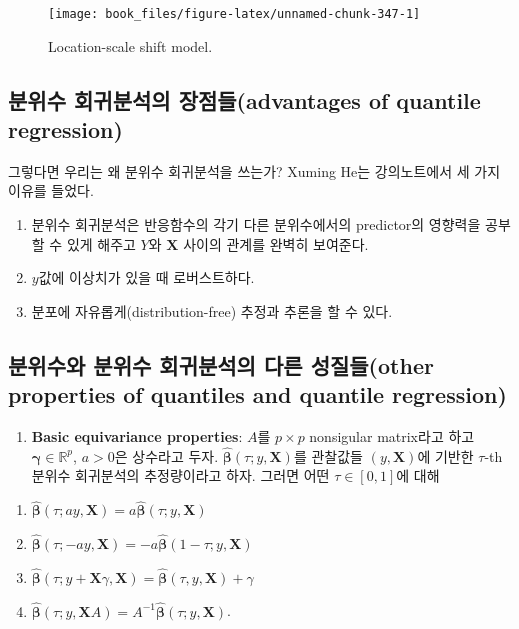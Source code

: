 \documentclass[b5paper,]{scrbook}
\providecommand{\tightlist}{%
  \setlength{\itemsep}{0pt}\setlength{\parskip}{0pt}}
\theoremstyle{plain}
\theoremstyle{definition}
\numberwithin{equation}{section}
\begin{document}
\begin{figure}

{\centering \texttt{[image: book\_files/figure-latex/unnamed-chunk-347-1]} 

}

\caption{Location-scale shift model.}\label{fig:unnamed-chunk-347}
\end{figure}

\hypertarget{--advantages-of-quantile-regression}{%
\subsection{분위수 회귀분석의 장점들(advantages of quantile regression)}\label{--advantages-of-quantile-regression}}

그렇다면 우리는 왜 분위수 회귀분석을 쓰는가? Xuming He는 강의노트에서 세 가지 이유를 들었다.

\begin{enumerate}
\def\labelenumi{\arabic{enumi}.}
\item
  분위수 회귀분석은 반응함수의 각기 다른 분위수에서의 predictor의 영향력을 공부할 수 있게 해주고 \(Y\)와 \(\mathbf{X}\) 사이의 관계를 완벽히 보여준다.
\item
  \(y\)값에 이상치가 있을 때 로버스트하다.
\item
  분포에 자유롭게(distribution-free) 추정과 추론을 할 수 있다.
\end{enumerate}

\hypertarget{----other-properties-of-quantiles-and-quantile-regression}{%
\subsection{분위수와 분위수 회귀분석의 다른 성질들(other properties of quantiles and quantile regression)}\label{----other-properties-of-quantiles-and-quantile-regression}}

\begin{enumerate}
\def\labelenumi{\arabic{enumi}.}
\tightlist
\item
  \textbf{Basic equivariance properties}: \(A\)를 \(p\times p\) nonsigular matrix라고 하고 \(\boldsymbol{\gamma}\in\mathbb{R}^{p}\), \(a>0\)은 상수라고 두자. \(\hat{\boldsymbol{\beta}}(\tau;y,\mathbf{X})\)를 관찰값들 \((y,\mathbf{X})\)에 기반한 \(\tau\)-th 분위수 회귀분석의 추정량이라고 하자. 그러면 어떤 \(\tau\in [0,1]\)에 대해
\end{enumerate}

\begin{enumerate}
\def\labelenumi{\roman{enumi}.}
\tightlist
\item
  \(\hat{\boldsymbol{\beta}}(\tau; ay, \mathbf{X})=a\hat{\boldsymbol{\beta}}(\tau;y,\mathbf{X})\)
\item
  \(\hat{\boldsymbol{\beta}}(\tau; -ay, \mathbf{X})=-a\hat{\boldsymbol{\beta}}(1-\tau;y,\mathbf{X})\)
\item
  \(\hat{\boldsymbol{\beta}}(\tau;y+\mathbf{X}\gamma, \mathbf{X})=\hat{\boldsymbol{\beta}}(\tau, y, \mathbf{X})+\gamma\)
\item
  \(\hat{\boldsymbol{\beta}}(\tau;y,\mathbf{X}A)=A^{-1}\hat{\boldsymbol{\beta}}(\tau;y,\mathbf{X})\).
\end{enumerate}
\end{document}
